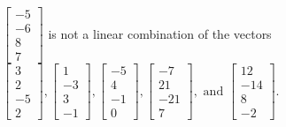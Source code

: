 \begin{exercise}
\begin{exerciseStatement}
  \end{exerciseStatement}
  \begin{exerciseAnswer}
   \(\left[\begin{array}{c}
-5 \\
-6 \\
8 \\
7
\end{array}\right]\) 
  	 is not  
	a linear combination of the vectors \(\left[\begin{array}{c}
3 \\
2 \\
-5 \\
2
\end{array}\right] , \left[\begin{array}{c}
1 \\
-3 \\
3 \\
-1
\end{array}\right] , \left[\begin{array}{c}
-5 \\
4 \\
-1 \\
0
\end{array}\right] , \left[\begin{array}{c}
-7 \\
21 \\
-21 \\
7
\end{array}\right] , \text{ and } \left[\begin{array}{c}
12 \\
-14 \\
8 \\
-2
\end{array}\right]\).

	
  


  \end{exerciseAnswer}
\end{exercise}